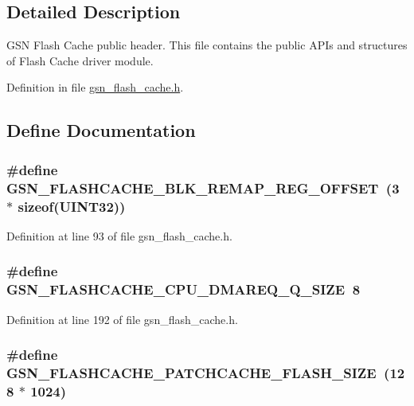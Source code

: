 \subsection{Detailed Description}
GSN Flash Cache public header. This file contains the public APIs and structures of Flash Cache driver module. 

Definition in file \hyperlink{a00500_source}{gsn\_\-flash\_\-cache.h}.



\subsection{Define Documentation}
\hypertarget{a00500_a6cf076bff36a8025789760126f41979c}{
\subsubsection[{GSN\_\-FLASHCACHE\_\-BLK\_\-REMAP\_\-REG\_\-OFFSET}]{\setlength{\rightskip}{0pt plus 5cm}\#define GSN\_\-FLASHCACHE\_\-BLK\_\-REMAP\_\-REG\_\-OFFSET~(3 $\ast$ sizeof({\bf UINT32}))}}
\label{a00500_a6cf076bff36a8025789760126f41979c}


Definition at line 93 of file gsn\_\-flash\_\-cache.h.

\hypertarget{a00500_ab1c5953ab32b32e1274fe9053eff3839}{
\subsubsection[{GSN\_\-FLASHCACHE\_\-CPU\_\-DMAREQ\_\-Q\_\-SIZE}]{\setlength{\rightskip}{0pt plus 5cm}\#define GSN\_\-FLASHCACHE\_\-CPU\_\-DMAREQ\_\-Q\_\-SIZE~8}}
\label{a00500_ab1c5953ab32b32e1274fe9053eff3839}


Definition at line 192 of file gsn\_\-flash\_\-cache.h.

\hypertarget{a00500_af657535573b5a6523955a1e187345d0d}{
\subsubsection[{GSN\_\-FLASHCACHE\_\-PATCHCACHE\_\-FLASH\_\-SIZE}]{\setlength{\rightskip}{0pt plus 5cm}\#define GSN\_\-FLASHCACHE\_\-PATCHCACHE\_\-FLASH\_\-SIZE~(128 $\ast$ 1024)}}
\label{a00500_af657535573b5a6523955a1e187345d0d}


